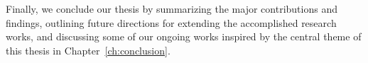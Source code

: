 Finally, we conclude our thesis by summarizing the major contributions and findings, outlining future directions for extending the accomplished research works, and discussing some of our ongoing works inspired by the central theme of this thesis in Chapter~\ref{ch:conclusion}.

